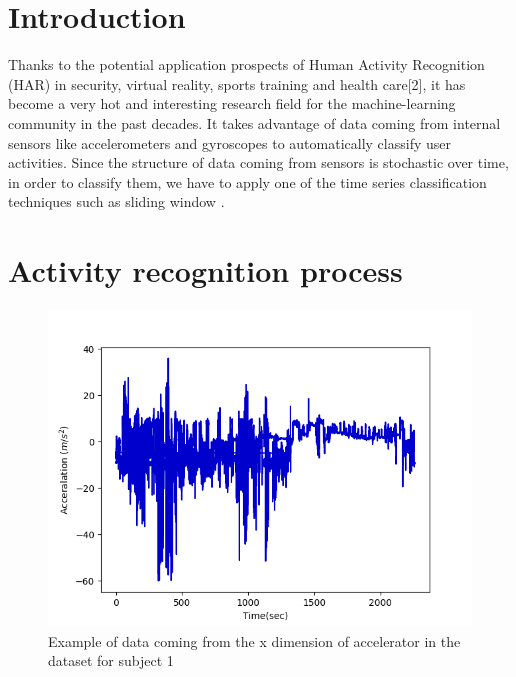 \section{Introduction}
Thanks to the potential application prospects of Human Activity 
Recognition (HAR) in security, virtual reality, sports training and 
health care[2], it has become a very hot and interesting research field 
for the machine-learning community in the past decades. It  takes 
advantage of data coming from internal sensors like accelerometers and 
gyroscopes to automatically classify user activities. Since the 
structure of data coming from sensors is stochastic over time, in order 
to classify them, we have to apply one of the time series 
classification techniques such as sliding window .

\section{Activity recognition process}
\begin{figure}[h]
    \centering
    \includegraphics[width=.4\textwidth]{Figures/signal.png}
    \caption{Example of data coming from the x dimension of accelerator in the dataset for subject 1  }
    \label{fig:signal}
\end{figure}



